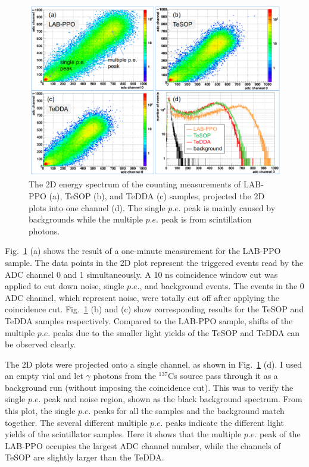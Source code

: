 \begin{figure}[htbp]
	\centering	
	\includegraphics[width=14cm]{TeLS_2Denergy.png}
	\caption[The 2D energy spectrum of the counting measurements.]{The 2D energy spectrum of the counting measurements of LAB-PPO (a), TeSOP (b), and TeDDA (c) samples, projected the 2D plots into one channel (d). The single $p.e.$ peak is mainly caused by backgrounds while the multiple $p.e.$ peak is from scintillation photons.}
	\label{teLSresults}
\end{figure}

Fig.~\ref{teLSresults} (a) shows the result of a one-minute measurement for the LAB-PPO sample. The data points in the 2D plot represent the triggered events read by the ADC channel 0 and 1 simultaneously. A 10 ns coincidence window cut was applied to cut down noise, single $p.e.$, and background events. The events in the 0 ADC channel, which represent noise, were totally cut off after applying the coincidence cut. Fig.~\ref{teLSresults} (b) and (c) show corresponding results for the TeSOP and TeDDA samples respectively. Compared to the LAB-PPO sample, shifts of the multiple $p.e.$ peaks due to the smaller light yields of the TeSOP and TeDDA can be observed clearly.

The 2D plots were projected onto a single channel, as shown in Fig.~\ref{teLSresults} (d). I used an empty vial and let $\gamma$ photons from the $^{137}$Cs source pass through it as a background run (without imposing the coincidence cut). This was to verify the single $p.e.$ peak and noise region, shown as the black background spectrum. From this plot, the single $p.e.$ peaks for all the samples and the background match together. The several different multiple $p.e.$ peaks indicate the different light yields of the scintillator samples. Here it shows that the multiple $p.e.$ peak of the LAB-PPO occupies the largest ADC channel number, while the channels of TeSOP are slightly larger than the TeDDA.

